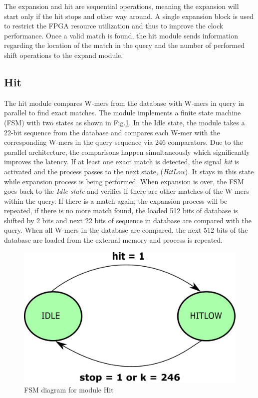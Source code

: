 The expansion and hit are sequential operations, meaning the expansion will start only if the hit stops and other way around. 
A single expansion block is used to restrict the FPGA resource utilization and thus to improve the clock performance.
Once a valid match is found, the hit module sends information regarding the location of the match in the query and the number of performed shift operations to the expand module. 
  
\subsection{Hit}
The hit module compares W-mers from the database with W-mers in query in parallel to find exact matches. 
The module implements a finite state machine (FSM) with two states as shown in Fig.\ref{fig:hitFSM}. 
In the Idle state, the module takes a 22-bit sequence from the database and compares each W-mer with the corresponding W-mers in the query sequence via 246 comparators. 
Due to the parallel architecture, the comparisons happen simultaneously which significantly improves the latency. 
If at least one exact match is detected, the signal \textit{hit} is activated and the process passes to the next state, (\textit{HitLow}).
It stays in this state while expansion process is being performed. When expansion is over, the FSM goes back to the \textit{Idle state} and verifies if there are other matches of the W-mers within the query. 
If there is a match again, the expansion process will be repeated, if there is no more match found, the loaded 512 bits of database is shifted by 2 bits and next 22 bits of sequence in database are compared with the query. 
When all W-mers in the database are compared, the next 512 bits of the database are loaded from the external memory and process is repeated. 

\begin{figure}[t!]
\centering
\includegraphics[width=0.7\columnwidth]{Figures/hitFSM.pdf}
\caption{FSM diagram for module Hit} \label{fig:hitFSM}
\end{figure}



